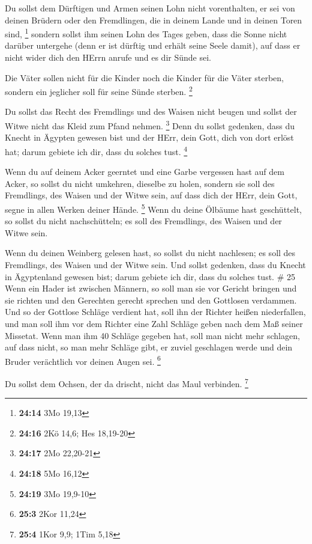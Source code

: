  Du sollst dem Dürftigen und Armen seinen Lohn nicht
vorenthalten, er sei von deinen Brüdern oder den Fremdlingen, die in
deinem Lande und in deinen Toren sind, \footnote{\textbf{24:14} 3Mo
  19,13}  sondern sollst ihm seinen Lohn des Tages geben,
dass die Sonne nicht darüber untergehe (denn er ist dürftig und erhält
seine Seele damit), auf dass er nicht wider dich den HErrn anrufe und es
dir Sünde sei.

 Die Väter sollen nicht für die Kinder noch die Kinder für
die Väter sterben, sondern ein jeglicher soll für seine Sünde sterben.
\footnote{\textbf{24:16} 2Kö 14,6; Hes 18,19-20}

 Du sollst das Recht des Fremdlings und des Waisen nicht
beugen und sollst der Witwe nicht das Kleid zum Pfand nehmen.
\footnote{\textbf{24:17} 2Mo 22,20-21}  Denn du sollst
gedenken, dass du Knecht in Ägypten gewesen bist und der HErr, dein
Gott, dich von dort erlöst hat; darum gebiete ich dir, dass du solches
tust. \footnote{\textbf{24:18} 5Mo 16,12}

 Wenn du auf deinem Acker geerntet und eine Garbe vergessen
hast auf dem Acker, so sollst du nicht umkehren, dieselbe zu holen,
sondern sie soll des Fremdlings, des Waisen und der Witwe sein, auf dass
dich der HErr, dein Gott, segne in allen Werken deiner Hände.
\footnote{\textbf{24:19} 3Mo 19,9-10}  Wenn du deine
Ölbäume hast geschüttelt, so sollst du nicht nachschütteln; es soll des
Fremdlings, des Waisen und der Witwe sein.

 Wenn du deinen Weinberg gelesen hast, so sollst du nicht
nachlesen; es soll des Fremdlings, des Waisen und der Witwe sein.
 Und sollst gedenken, dass du Knecht in Ägyptenland gewesen
bist; darum gebiete ich dir, dass du solches tust. \# 25 
Wenn ein Hader ist zwischen Männern, so soll man sie vor Gericht bringen
und sie richten und den Gerechten gerecht sprechen und den Gottlosen
verdammen.  Und so der Gottlose Schläge verdient hat, soll
ihn der Richter heißen niederfallen, und man soll ihm vor dem Richter
eine Zahl Schläge geben nach dem Maß seiner Missetat.  Wenn
man ihm 40 Schläge gegeben hat, soll man nicht mehr schlagen, auf dass
nicht, so man mehr Schläge gibt, er zuviel geschlagen werde und dein
Bruder verächtlich vor deinen Augen sei. \footnote{\textbf{25:3} 2Kor
  11,24}

 Du sollst dem Ochsen, der da drischt, nicht das Maul
verbinden. \footnote{\textbf{25:4} 1Kor 9,9; 1Tim 5,18}

